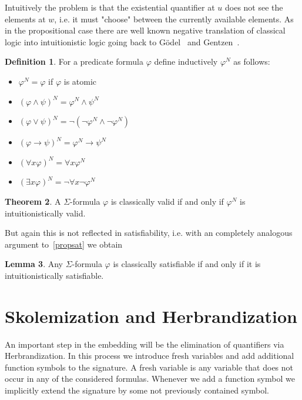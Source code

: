 \documentclass[a4paper,11pt]{report}
\theoremstyle{definition}
\newtheorem{theorem}{Theorem}[section]
\theoremstyle{definition}
\theoremstyle{definition}
\newtheorem{lemma}[theorem]{Lemma}
\theoremstyle{definition}
\theoremstyle{definition}
\newtheorem{definition}[theorem]{Definition}
\theoremstyle{definition}
\theoremstyle{definition}
\begin{document}
	Intuitively the problem is that the existential quantifier at $u$ does not see the elements at $w$, i.e. it must "choose" between the currently available elements. As in the propositional case there are well known negative translation of classical logic into intuitionistic logic going back to G\"odel~\cite{godel1933intuitionistischen} and Gentzen~\cite{gentzen1936widerspruchsfreiheit}.
	
	\begin{definition}
		For a predicate formula $\varphi$ define inductively $\varphi^N$ as follows:
		\begin{itemize}
			\item $\varphi^N = \varphi$ if $\varphi$ is atomic
			\item $(\varphi\wedge\psi)^N = \varphi^N\wedge\psi^N$
			\item $(\varphi\vee\psi)^N = \neg(\neg\varphi^N\wedge\neg\varphi^N)$
			\item $(\varphi\to\psi)^N = \varphi^N\to\psi^N$
			\item $(\forall x\varphi)^N = \forall x\varphi^N$
			\item $(\exists x\varphi)^N = \neg\forall x\neg\varphi^N$
		\end{itemize}
	\end{definition}
	\begin{theorem}
		A $\Sigma$-formula $\varphi$ is classically valid if and only if $\varphi^N$ is intuitionistically valid.
	\end{theorem}
	
	But again this is not reflected in satisfiability, i.e. with an completely analogous argument to~\ref{propsat} we obtain
	
	\begin{lemma}
		Any $\Sigma$-formula $\varphi$ is classically satisfiable if and only if it is intuitionistically satisfiable.
	\end{lemma}
	
	\section{Skolemization and Herbrandization}
	
	An important step in the embedding will be the elimination of quantifiers via Herbrandization.
	In this process we introduce fresh variables and add additional function symbols to the signature.
	A fresh variable is any variable that does not occur in any of the considered formulas.
	Whenever we add a function symbol we implicitly extend the signature by some not previously contained symbol.
	
\end{document}
